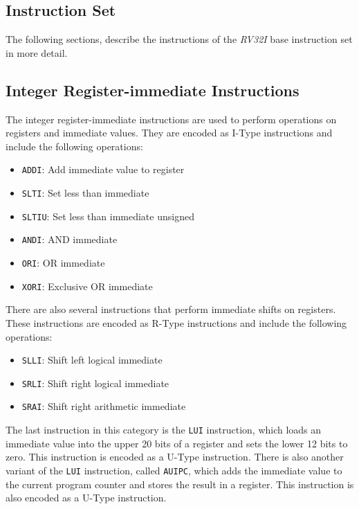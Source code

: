 \documentclass[sigconf]{acmart}
\begin{document}
\cite{riscv-spec}

\subsection{Instruction Set}
The following sections, describe the instructions of the \textit{RV32I} base instruction set in more detail.

\subsection{Integer Register-immediate Instructions}
The integer register-immediate instructions are used to perform operations on registers and immediate values. They are encoded as I-Type instructions and include the following operations:
\begin{itemize}
    \item \texttt{ADDI}: Add immediate value to register
    \item \texttt{SLTI}: Set less than immediate
    \item \texttt{SLTIU}: Set less than immediate unsigned
    \item \texttt{ANDI}: AND immediate
    \item \texttt{ORI}: OR immediate
    \item \texttt{XORI}: Exclusive OR immediate
\end{itemize}
There are also several instructions that perform immediate shifts on registers. These instructions are encoded as R-Type instructions and include the following operations:
\begin{itemize}
    \item \texttt{SLLI}: Shift left logical immediate
    \item \texttt{SRLI}: Shift right logical immediate
    \item \texttt{SRAI}: Shift right arithmetic immediate
\end{itemize}
The last instruction in this category is the \texttt{LUI} instruction, which loads an immediate value into the upper 20 bits of a register and sets the lower 12 bits to zero. This instruction is encoded as a U-Type instruction.
There is also another variant of the \texttt{LUI} instruction, called \texttt{AUIPC}, which adds the immediate value to the current program counter and stores the result in a register. This instruction is also encoded as a U-Type instruction. \cite{riscv-spec}
\end{document}
